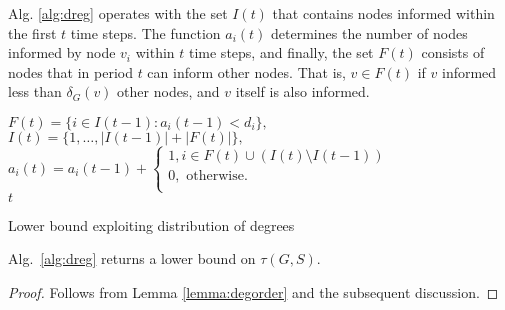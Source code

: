 Alg. \ref{alg:dreg} operates with the set $I(t)$ that contains nodes informed within the first $t$ time steps.
The function $a_i(t)$ determines the number of nodes informed by node $v_i$ within $t$ time steps, and finally,
the set $F(t)$ consists of nodes that in period $t$ can inform other nodes.
That is, $v\in F(t)$ if $v$ informed less than $\delta_G(v)$ other nodes, and $v$ itself is also informed.

\begin{algorithm}
 {
	$F(t)=\{i\in I(t-1):a_i(t-1)<d_i\},$\\
	$I(t)=\{1,\dots,|I(t-1)|+|F(t)|\},$\\
	$a_i(t)=a_i(t-1)+
	\begin{cases}
		1, i\in F(t)\cup \left(I(t)\setminus I(t-1)\right) \\
		0, \text{ otherwise. }\\
	\end{cases}$\\
	 {\Return $t$}
		
}
\caption{Lower bound exploiting distribution of degrees}
\label{alg:dreg}
\end{algorithm}


\begin{proposition}
Alg.~\ref{alg:dreg} returns a lower bound on $\tau(G,S)$.
\label{cor:deg}
\end{proposition}
\begin{proof}
		Follows from Lemma \ref{lemma:degorder} and the subsequent discussion. 
\end{proof}

